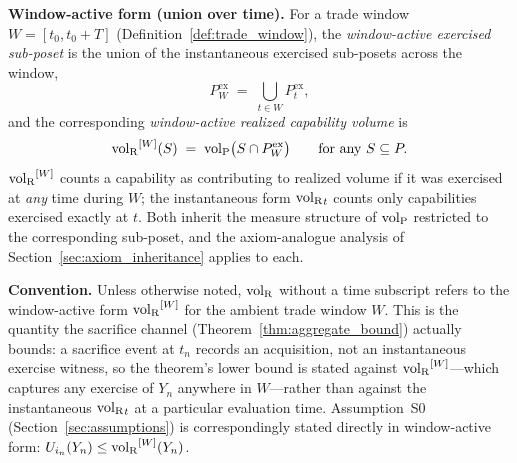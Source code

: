 \begin{definition}
\medskip\noindent
\textbf{Window-active form (union over time).}
For a trade window $W = [t_0, t_0 + T]$
(Definition~\ref{def:trade_window}), the \emph{window-active
exercised sub-poset} is the union of the instantaneous
exercised sub-posets across the window,
\[
  P^{\mathrm{ex}}_W \;=\; \bigcup_{t \in W}
  P^{\mathrm{ex}}_t,
\]
and the corresponding \emph{window-active realized
capability volume} is
\[
  {\operatorname{vol}_{\mathrm{R}}}^{[W]}(S) \;=\; {\operatorname{vol}_{\mathrm{P}}}\bigl(S \cap P^{\mathrm{ex}}_W\bigr)
  \qquad \text{for any } S \subseteq P.
\]
${\operatorname{vol}_{\mathrm{R}}}^{[W]}$ counts a capability as contributing to realized
volume if it was exercised at \emph{any} time during $W$; the
instantaneous form ${\operatorname{vol}_{\mathrm{R}}}_t$ counts only capabilities exercised
exactly at $t$.  Both inherit the measure structure of ${\operatorname{vol}_{\mathrm{P}}}$
restricted to the corresponding sub-poset, and the
axiom-analogue analysis of
Section~\ref{sec:axiom_inheritance} applies to each.

\medskip\noindent
\textbf{Convention.}
Unless otherwise noted, ${\operatorname{vol}_{\mathrm{R}}}$ without a time subscript refers
to the window-active form ${\operatorname{vol}_{\mathrm{R}}}^{[W]}$ for the ambient
trade window $W$.  This is the quantity the sacrifice channel
(Theorem~\ref{thm:aggregate_bound}) actually bounds: a sacrifice
event at $t_n$ records an acquisition, not an instantaneous
exercise witness, so the theorem's lower bound is stated
against ${\operatorname{vol}_{\mathrm{R}}}^{[W]}$---which captures any exercise of $Y_n$
anywhere in $W$---rather than against the instantaneous
${\operatorname{vol}_{\mathrm{R}}}_{t}$ at a particular evaluation time.  Assumption~S0
(Section~\ref{sec:assumptions}) is correspondingly stated
directly in window-active form:
$U_{i_{n}}(Y_n) \leq {\operatorname{vol}_{\mathrm{R}}}^{[W]}(Y_n)$.
\end{definition}

